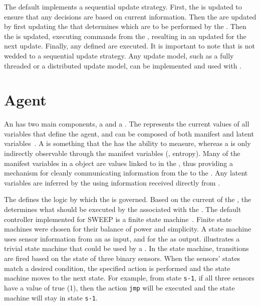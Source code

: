The default  implements a sequential update strategy. First, the  is updated to ensure that any  decisions are based on current information. Then the  are updated by first updating the  that determines which  are to be performed by the . Then the  is updated, executing commands from the , resulting in an updated  for the next  update. Finally, any defined  are executed.  It is important to note that \SWEEP{} is not wedded to a sequential update strategy. Any update model, such as a fully threaded or a distributed  update model, can be implemented and used with \SWEEP{}.

\section{Agent}
An  has two main components, a  and a . The  represents the current values of all variables that define the agent, and can be composed of both manifest and latent variables~\cite{jpolderman:SystemsTheoryBehavioral}.  A  is something that the  has the ability to measure, whereas a  is only indirectly observable through the manifest variables (\eg, entropy).  Many of the manifest variables in a  object are values linked to  in the , thus providing a mechanism for cleanly communicating  information from the  to the .  Any latent variables are inferred by the  using information received directly from .

The  defines the logic by which the  is governed. Based on the current  of the , the  determines what  should be executed by the  associated with the .  The default controller implemented for SWEEP is a finite state machine~\cite{plinz:FormalLanguages}. Finite state machines were chosen for their balance of power and simplicity.  A state machine uses sensor information from an  as input, and  for the  as output.   illustrates a trivial state machine that could be used by a \SWEEP{} .  In the state machine, transitions are fired based on the state of three binary sensors.  When the sensors' states match a desired condition, the specified action is performed and the state machine moves to the next state.  For example, from state \texttt{s-1}, if all three sensors have a value of true (1), then the action \texttt{jmp} will be executed and the state machine will stay in state \texttt{s-1}.

